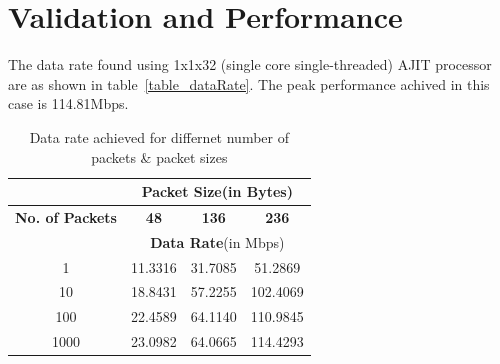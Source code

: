 \documentclass[12pt]{report}
\begin{document}
 \section{Validation and Performance}
                The data rate found using 1x1x32 (single core single-threaded) AJIT processor are as shown in table~\ref{table_dataRate}. The peak performance achived in this case is 114.81Mbps.
                \begin{table}[htbp]
                        \caption{Data rate achieved for differnet number of packets \& packet sizes}
                        \begin{center}
                                \begin{tabular}{|c|c|c|c|}
                                        \hline
                                        & \multicolumn{3}{c|}{\textbf{Packet Size}(in Bytes)}\\
                                        \hline
                                        \textbf{No. of Packets}& \textbf{48}                    & \textbf{136}                  & \textbf{236}    \\
                                        \hline
                                        &  \multicolumn{3}{c|}{\textbf{Data Rate}(in Mbps)}\\
                                        \hline
                                        1                       & 11.3316                       & 31.7085                       & 51.2869 \\
                                        \hline
                                        10                      & 18.8431                       & 57.2255                       & 102.4069\\
                                        \hline
                                        100                     & 22.4589                       & 64.1140                       & 110.9845\\
                                        \hline
                                        1000                    & 23.0982                       & 64.0665                       & 114.4293\\

\end{tabular}
\end{center}
\end{table}
\end{document}
